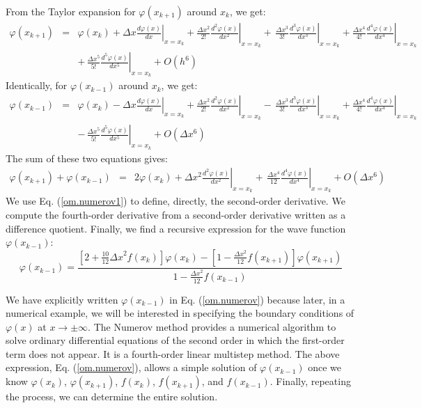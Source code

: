 \documentclass[onecolumn,nofootinbib, secnumarabic, amsmath, nobibnotes,11pt,aps,pra]{revtex4-1}
\newcommand{\eref}[1]{Eq. (\ref{#1})}
\begin{document}
From the Taylor expansion for $\varphi(x_{k + 1})$ around $x_k$, we get:
\begin{eqnarray}
\varphi(x_{k + 1}) &=& \varphi(x_{k}) + \Delta x \left.\frac {d\varphi(x)}{dx}\right|_{x = x_k} + \frac{\Delta x^2}{2!} \left.\frac {d^2\varphi(x)}{dx^2}\right|_{x = x_k} +\, \left.\frac{\Delta x^3}{3!} \frac{d^3\varphi(x)}{dx^3}\right|_{x = x_k} + \frac{\Delta x^4}{4!} \left.\frac{d^4\varphi(x)}{dx^4}\right|_{x = x_k}\nonumber\\
&&+\, \frac{\Delta x^5}{5!} \left.\frac{d^5\varphi(x)}{dx^5}\right|_{x = x_k} + {O} (h^6)
\end{eqnarray}
Identically, for $\varphi(x_{k-1})$ around $x_k$, we get:
\begin{eqnarray}
\varphi(x_{k - 1}) &=& \varphi(x_{k}) - \Delta x \left.\frac {d\varphi(x)}{dx}\right|_{x = x_k} + \frac{\Delta x^2}{2!} \left. \frac {d^2\varphi(x)}{dx^2}\right|_{x = x_k}-\, \frac{\Delta x^3}{3!} \left.\frac{d^3\varphi(x)}{dx^3}\right|_{x = x_k}
 + \frac{\Delta x^4}{4!} \left.\frac{d^4\varphi(x)}{dx^4}\right|_{x = x_k}\nonumber\\ &&-\, \frac{\Delta x^5}{5!} \left.\frac{d^5\varphi(x)}{dx^5}\right|_{x = x_k} + {O} (\Delta x^6)
\end{eqnarray}
The sum of these two equations gives:
\begin{eqnarray}
\varphi(x_{k + 1}) + \varphi(x_{k-1}) &=& 2\varphi(x_{k}) + {\Delta x^2} \left.\frac {d^2\varphi(x)}{dx^2}\right|_{x = x_k}+\, \frac{\Delta x^4}{12} \left.\frac {d^4\varphi(x)}{dx^4}\right|_{x = x_k} + {O} (\Delta x^6)
\end{eqnarray}
We use \eref{om.numerov1} to define, directly, the second-order derivative. We compute the fourth-order derivative from a second-order derivative written as a difference  quotient. Finally, we find a recursive expression for the wave function $\varphi(x_{k-1})$:
\begin{equation}
\varphi(x_{k - 1}) = \frac{\left[2 + \frac{10}{12}{\Delta x}^{2}f(x_k) \right]\varphi(x_{k}) - \left[1 - \frac{{\Delta x}^{2}}{12}f(x_{k + 1}) \right]\varphi(x_{k + 1})}{1 - \frac{{\Delta x}^{2}}{12}f(x_{k - 1})}
\label{om.numerov}
\end{equation}

We have explicitly written $\varphi(x_{k - 1})$ in \eref{om.numerov}
because later, in a numerical example, we will be interested in
specifying the boundary conditions of $\varphi(x)$ at $x\rightarrow
\pm \infty$. The Numerov method \cite{om.numrov1,om.numrov2}
provides a numerical algorithm to solve ordinary differential
equations of the second order in which the first-order term does not
appear. It is a fourth-order linear multistep method. The above
expression, \eref{om.numerov}, allows a simple solution of
$\varphi(x_{k-1})$ once we know $\varphi(x_{k})$, $\varphi(x_{k +
1})$, $f(x_k)$, $f(x_{k + 1})$, and $f(x_{k-1})$. Finally, repeating
the process, we can determine the entire solution.
\end{document}
